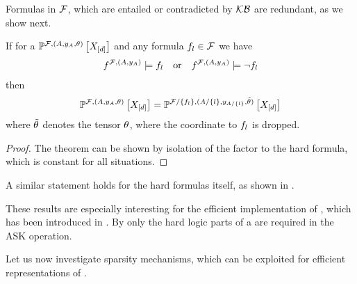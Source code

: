 Formulas in $\mathcal{F}$, which are entailed or contradicted by $\mathcal{KB}$ are redundant, as we show next.

\begin{theorem}%
    If for a \HybridLogicNetwork{} $\mathbb{P}^{\mathcal{F},(A,y_{A},\theta)}\left[X_{[d]}\right]$ and any formula $f_{l}\in\mathcal{F}$ we have
    \begin{align*}
        f^{\mathcal{F},(A,y_{A})}\models f_{l}  \quad \text{or} \quad f^{\mathcal{F},(A,y_{A})}\models\lnot f_{l}
    \end{align*}
    then
    \begin{align*}
        \mathbb{P}^{\mathcal{F},(A,y_{A},\theta)}\left[X_{[d]}\right] = \mathbb{P}^{\mathcal{F}/\{f_{l}\},(A/\{l\},y_{A/\{l\}},\tilde{\theta})}\left[X_{[d]}\right]
    \end{align*}
    where $\tilde{\theta}$ denotes the tensor $\theta$, where the coordinate to $f_{l}$ is dropped.
\end{theorem}
\begin{proof}
    The theorem can be shown by isolation of the factor to the hard formula, which is constant for all situations.
\end{proof}

A similar statement holds for the hard formulas itself, as shown in .

These results are especially interesting for the efficient implementation of , which has been introduced in .
By  only the hard logic parts of a \HybridLogicNetwork{} are required in the ASK operation.



Let us now investigate sparsity mechanisms, which can be exploited for efficient representations of \HybridLogicNetworks{}.

\subsect{\DecompositionSparsity{}}

